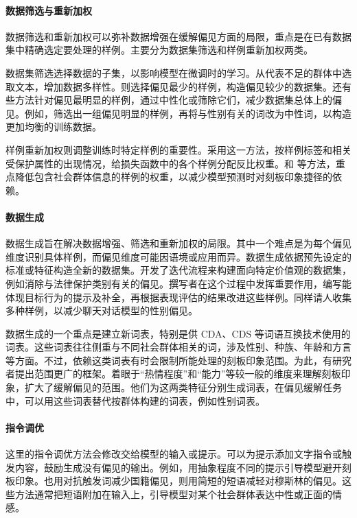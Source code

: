 \paragraph*{数据筛选与重新加权}
数据筛选和重新加权可以弥补数据增强在缓解偏见方面的局限，重点是在已有数据集中精确选定要处理的样例。主要分为数据集筛选和样例重新加权两类。

数据集筛选选择数据的子集，以影响模型在微调时的学习。从代表不足的群体中选取文本，增加数据多样性。则选择偏见最少的样例，构造偏见较少的数据集。还有些方法针对偏见最明显的样例，通过中性化或筛除它们，减少数据集总体上的偏见。例如，筛选出一组偏见明显的样例，再将与性别有关的词改为中性词，以构造更加均衡的训练数据。

样例重新加权则调整训练时特定样例的重要性。采用这一方法，按样例标签和相关受保护属性的出现情况，给损失函数中的各个样例分配反比权重。和 等方法，重点降低包含社会群体信息的样例的权重，以减少模型预测时对刻板印象捷径的依赖。

\paragraph*{数据生成}
数据生成旨在解决数据增强、筛选和重新加权的局限。其中一个难点是为每个偏见维度识别具体样例，而偏见维度可能因语境或应用而异。数据生成依据预先设定的标准或特征构造全新的数据集。开发了迭代流程来构建面向特定价值观的数据集，例如消除与法律保护类别有关的偏见。撰写者在这个过程中发挥重要作用，编写能体现目标行为的提示及补全，再根据表现评估的结果改进这些样例。同样请人收集多种样例，以减少聊天对话模型的性别偏见。

数据生成的一个重点是建立新词表，特别是供 CDA、CDS 等词语互换技术使用的词表。这些词表往往侧重与不同社会群体相关的词，涉及性别、种族、年龄和方言等方面。不过，依赖这类词表有时会限制所能处理的刻板印象范围。为此，有研究者提出范围更广的框架。着眼于“热情程度”和“能力”等较一般的维度来理解刻板印象，扩大了缓解偏见的范围。他们为这两类特征分别生成词表，在偏见缓解任务中，可以用这些词表替代按群体构建的词表，例如性别词表。

\paragraph*{指令调优}
这里的指令调优方法会修改交给模型的输入或提示。可以为提示添加文字指令或触发内容，鼓励生成没有偏见的输出。例如，用抽象程度不同的提示引导模型避开刻板印象。也用对抗触发词减少国籍偏见，则用简短的短语减轻对穆斯林的偏见。这些方法通常把短语附加在输入上，引导模型对某个社会群体表达中性或正面的情感。


